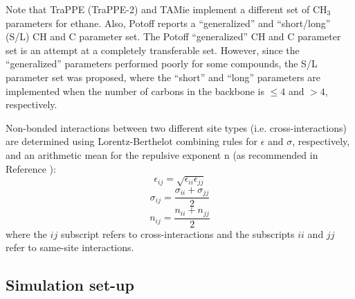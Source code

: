 \documentclass[preprint,review,12pt]{elsarticle}
\begin{document}
    Note that TraPPE (TraPPE-2) and TAMie implement a different set of CH$_3$ parameters for ethane. Also, Potoff reports a ``generalized'' and ``short/long'' (S/L) CH and C parameter set. The Potoff ``generalized'' CH and C parameter set is an attempt at a completely transferable set. However, since the ``generalized'' parameters performed poorly for some compounds, the S/L parameter set was proposed, where the ``short'' and ``long'' parameters are implemented when the number of carbons in the backbone is $\le 4$ and $> 4$, respectively.
	
	Non-bonded interactions between two different site types (i.e. cross-interactions) are determined using Lorentz-Berthelot combining rules \cite{Allen1987} for $\epsilon$ and $\sigma$, respectively, and an arithmetic mean for the repulsive exponent n (as recommended in Reference ):
	\begin{equation} \label{eq:Lorentz-Berthelot_eps}
	\epsilon_{ij} = \sqrt{\epsilon_{ii} \epsilon_{jj}}
	\end{equation}
	\begin{equation} \label{eq:Lorentz-Berthelot_sig}
	\sigma_{ij} = \frac{\sigma_{ii} + \sigma_{jj}}{2}
	\end{equation}
	\begin{equation} \label{eq:Lorentz-Berthelot_lam}
	n_{ij} = \frac{n_{ii} + n_{jj}}{2}
	\end{equation}
	where the $ij$ subscript refers to cross-interactions and the subscripts $ii$ and $jj$ refer to same-site interactions. 
	
	
	\subsection{Simulation set-up}
	
\end{document}

